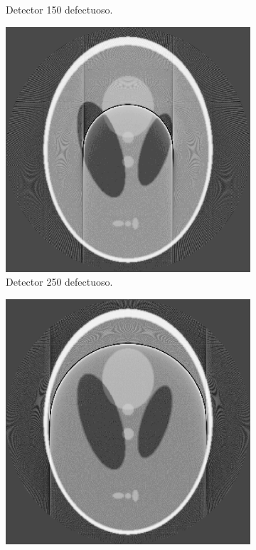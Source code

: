 \documentclass[letterpaper,12pt]{article}
\theoremstyle{plain}
\begin{document}
\begin{figure}[H]
\begin{subfigure}[h]{0.24\textwidth}
           \caption{Detector 150 defectuoso.} 
           \label{fig:sinograma_150}
        \end{subfigure}
        \begin{subfigure}[h]{0.24\textwidth}
           \centering
           \includegraphics[width=\textwidth]{Figuras/reconstruction_250_EQ.png}
           \caption{Detector 250 defectuoso.}
           \label{fig:sinograma_250} 
        \end{subfigure}
        \begin{subfigure}[h]{0.24\textwidth}
           \centering
           \includegraphics[width=\textwidth]{Figuras/reconstruction_300_EQ.png}

\end{subfigure}
\end{figure}
\end{document}
